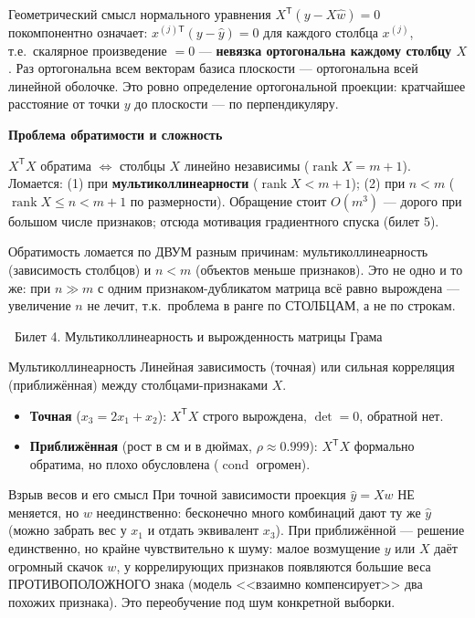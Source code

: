 \documentclass[12pt, a4paper]{article}
\newcommand{\bilet}[2]{%
  \vspace{10pt}%
  \noindent\colorbox{qcolor}{\parbox{\dimexpr\linewidth-2\fboxsep\relax}{%
    \color{white}\large\bfseries\strut\ Билет #1. #2%
  }}%
  \nopagebreak\vspace{5pt}\par\nopagebreak%
}
\newcommand{\qsub}[1]{%
  \vspace{5pt}%
  {\bfseries\color{defblue} #1}%
  \par\vspace{2pt}%
}
\newcommand{\rank}{\operatorname{rank}}
\newcommand{\cond}{\operatorname{cond}}
\newcommand{\tr}{^{\mathsf{T}}}
\newcommand{\wh}[1]{\widehat{#1}}
\begin{document}
\begin{propbox}{Геометрический смысл нормального уравнения}
$X\tr(y - X\wh w) = 0$ покомпонентно означает: $x^{(j)\mathsf{T}}(y - \wh y) = 0$ для каждого столбца $x^{(j)}$, т.е.\ скалярное произведение $=0$ --- \textbf{невязка ортогональна каждому столбцу $X$}. Раз ортогональна всем векторам базиса плоскости --- ортогональна всей линейной оболочке. Это ровно определение ортогональной проекции: кратчайшее расстояние от точки $y$ до плоскости --- по перпендикуляру.
\end{propbox}

\qsub{Проблема обратимости и сложность}
$X\tr X$ обратима $\Leftrightarrow$ столбцы $X$ линейно независимы ($\rank X = m{+}1$). Ломается: (1) при \textbf{мультиколлинеарности} ($\rank X < m{+}1$); (2) при $n < m$ ($\rank X \le n < m{+}1$ по размерности). Обращение стоит $O(m^3)$ --- дорого при большом числе признаков; отсюда мотивация градиентного спуска (билет 5).

\begin{fishkabox}
Обратимость ломается по ДВУМ разным причинам: мультиколлинеарность (зависимость столбцов) и $n < m$ (объектов меньше признаков). Это не одно и то же: при $n \gg m$ с одним признаком-дубликатом матрица всё равно вырождена --- увеличение $n$ не лечит, т.к.\ проблема в ранге по СТОЛБЦАМ, а не по строкам.
\end{fishkabox}

\bilet{4}{Мультиколлинеарность и вырожденность матрицы Грама}

\begin{defbox}{Мультиколлинеарность}
Линейная зависимость (точная) или сильная корреляция (приближённая) между столбцами-признаками $X$.
\begin{itemize}
  \item \textbf{Точная} ($x_3 = 2x_1 + x_2$): $X\tr X$ строго вырождена, $\det = 0$, обратной нет.
  \item \textbf{Приближённая} (рост в см и в дюймах, $\rho \approx 0.999$): $X\tr X$ формально обратима, но плохо обусловлена ($\cond$ огромен).
\end{itemize}
\end{defbox}

\begin{propbox}{Взрыв весов и его смысл}
При точной зависимости проекция $\wh y = Xw$ НЕ меняется, но $w$ неединственно: бесконечно много комбинаций дают ту же $\wh y$ (можно забрать вес у $x_1$ и отдать эквивалент $x_3$). При приближённой --- решение единственно, но крайне чувствительно к шуму: малое возмущение $y$ или $X$ даёт огромный скачок $w$, у коррелирующих признаков появляются большие веса ПРОТИВОПОЛОЖНОГО знака (модель <<взаимно компенсирует>> два похожих признака). Это переобучение под шум конкретной выборки.
\end{propbox}
\end{document}
